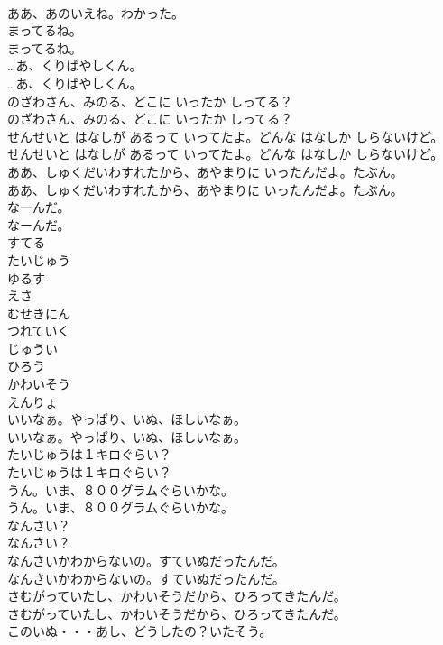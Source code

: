 \documentclass[8pt]{extreport}
\begin{document}
\begin{CJK}{UTF8}{min}
\\	ああ、あのいえね。わかった。 
\\	まってるね。	
\\	まってるね。 
\\	…あ、くりばやしくん。	
\\	…あ、くりばやしくん。 
\\	のざわさん、みのる、どこに いったか しってる？	
\\	のざわさん、みのる、どこに いったか しってる？ 
\\	せんせいと はなしが あるって いってたよ。どんな はなしか しらないけど。	
\\	せんせいと はなしが あるって いってたよ。どんな はなしか しらないけど。 
\\	ああ、しゅくだいわすれたから、あやまりに いったんだよ。たぶん。	
\\	ああ、しゅくだいわすれたから、あやまりに いったんだよ。たぶん。 
\\	なーんだ。	
\\	なーんだ。 
\\	すてる
\\	たいじゅう
\\	ゆるす
\\	えさ
\\	むせきにん
\\	つれていく
\\	じゅうい
\\	ひろう
\\	かわいそう
\\	えんりょ
\\	いいなぁ。やっぱり、いぬ、ほしいなぁ。	
\\	いいなぁ。やっぱり、いぬ、ほしいなぁ。 
\\	たいじゅうは１キロぐらい？	
\\	たいじゅうは１キロぐらい？ 
\\	うん。いま、８００グラムぐらいかな。	
\\	うん。いま、８００グラムぐらいかな。 
\\	なんさい？	
\\	なんさい？ 
\\	なんさいかわからないの。すていぬだったんだ。	
\\	なんさいかわからないの。すていぬだったんだ。 
\\	さむがっていたし、かわいそうだから、ひろってきたんだ。	
\\	さむがっていたし、かわいそうだから、ひろってきたんだ。 
\\	このいぬ・・・あし、どうしたの？いたそう。	

\end{CJK}
\end{document}
